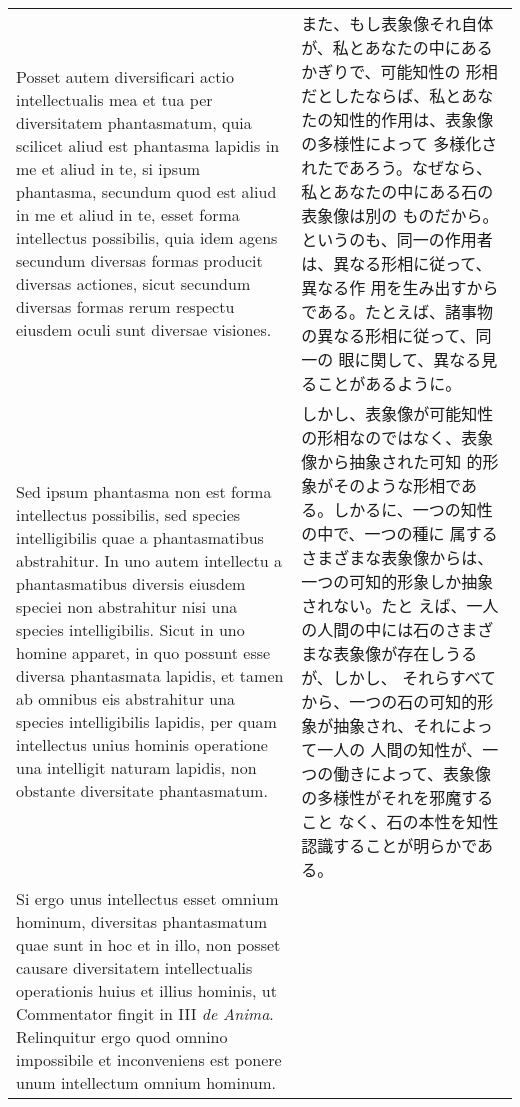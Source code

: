 \documentclass[paper=a4paper,fontsize=10pt,jafontsize=9pt,titlepage]{jlreq}
\begin{document}
\begin{longtable}{p{21em}p{21em}}
\\



 Posset autem diversificari actio intellectualis mea et tua per
 diversitatem phantasmatum, quia scilicet aliud est phantasma lapidis
 in me et aliud in te, si ipsum phantasma, secundum quod est aliud in
 me et aliud in te, esset forma intellectus possibilis, quia idem
 agens secundum diversas formas producit diversas actiones, sicut
 secundum diversas formas rerum respectu eiusdem oculi sunt diversae
 visiones.

 &

 また、もし表象像それ自体が、私とあなたの中にあるかぎりで、可能知性の
 形相だとしたならば、私とあなたの知性的作用は、表象像の多様性によって
 多様化されたであろう。なぜなら、私とあなたの中にある石の表象像は別の
 ものだから。というのも、同一の作用者は、異なる形相に従って、異なる作
 用を生み出すからである。たとえば、諸事物の異なる形相に従って、同一の
 眼に関して、異なる見ることがあるように。

\\

 Sed ipsum phantasma non est forma intellectus possibilis, sed species
 intelligibilis quae a phantasmatibus abstrahitur. In uno autem
 intellectu a phantasmatibus diversis eiusdem speciei non abstrahitur
 nisi una species intelligibilis. Sicut in uno homine apparet, in quo
 possunt esse diversa phantasmata lapidis, et tamen ab omnibus eis
 abstrahitur una species intelligibilis lapidis, per quam intellectus
 unius hominis operatione una intelligit naturam lapidis, non obstante
 diversitate phantasmatum.

&

 しかし、表象像が可能知性の形相なのではなく、表象像から抽象された可知
 的形象がそのような形相である。しかるに、一つの知性の中で、一つの種に
 属するさまざまな表象像からは、一つの可知的形象しか抽象されない。たと
 えば、一人の人間の中には石のさまざまな表象像が存在しうるが、しかし、
 それらすべてから、一つの石の可知的形象が抽象され、それによって一人の
 人間の知性が、一つの働きによって、表象像の多様性がそれを邪魔すること
 なく、石の本性を知性認識することが明らかである。
 
\\


 Si ergo unus intellectus esset omnium hominum, diversitas
 phantasmatum quae sunt in hoc et in illo, non posset causare
 diversitatem intellectualis operationis huius et illius hominis, ut
 Commentator fingit in III {\itshape de Anima}. Relinquitur ergo quod
 omnino impossibile et inconveniens est ponere unum intellectum omnium
 hominum.


\end{longtable}
\end{document}
